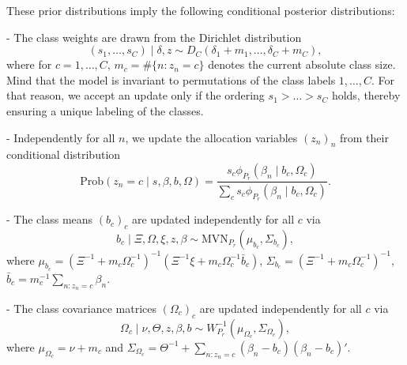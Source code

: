 \documentclass[article]{jss}
\begin{document}
These prior distributions imply the following conditional posterior distributions:

- The class weights are drawn from the Dirichlet distribution
\begin{equation}
(s_1,\dots,s_C)\mid \delta,z \sim D_C(\delta_1+m_1,\dots,\delta_C+m_C),
\end{equation}
where for $c=1,\dots,C$, $m_c=\#\{n:z_n=c\}$ denotes the current absolute class size. Mind that the model is invariant to permutations of the class labels $1,\dots,C$. For that reason, we accept an update only if the ordering $s_1>\dots>s_C$ holds, thereby ensuring a unique labeling of the classes.

- Independently for all $n$, we update the allocation variables $(z_n)_n$ from their conditional distribution
\begin{equation}
\text{Prob}(z_n=c\mid s,\beta,b,\Omega )=\frac{s_c\phi_{P_r}(\beta_n\mid b_c,\Omega_c)}{\sum_c s_c\phi_{P_r}(\beta_n\mid b_c,\Omega_c)}.
\end{equation}

- The class means $(b_c)_c$ are updated independently for all $c$ via
\begin{equation}
b_c\mid \Xi,\Omega,\xi,z,\beta \sim\text{MVN}_{P_r}\left( \mu_{b_c}, \Sigma_{b_c}  \right),
\end{equation}
where $\mu_{b_c}=(\Xi^{-1}+m_c\Omega_c^{-1})^{-1}(\Xi^{-1}\xi +m_c\Omega_c^{-1}\bar{b}_c)$, $\Sigma_{b_c}=(\Xi^{-1}+m_c\Omega_c^{-1})^{-1}$, $\bar{b}_c=m_c^{-1}\sum_{n:z_n=c} \beta_n$.

- The class covariance matrices $(\Omega_c)_c$ are updated independently for all $c$ via
\begin{equation}
\Omega_c \mid \nu,\Theta,z,\beta,b \sim W^{-1}_{P_r}(\mu_{\Omega_c},\Sigma_{\Omega_c}),
\end{equation}
where $\mu_{\Omega_c}=\nu+m_c$ and $\Sigma_{\Omega_c}=\Theta^{-1} + \sum_{n:z_n=c} (\beta_n-b_c)(\beta_n-b_c)'$.
\end{document}
